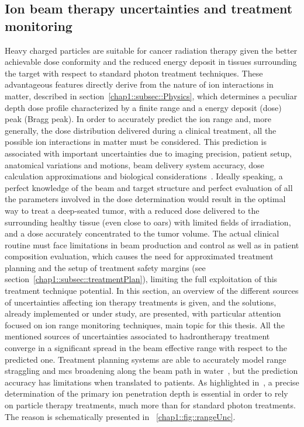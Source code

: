 \subsection{Ion beam therapy uncertainties and treatment monitoring}\label{chap1::subsec::uncertainty}
Heavy charged particles are suitable for cancer radiation therapy given the better achievable dose conformity and the reduced energy deposit in tissues surrounding the target with respect to standard photon treatment techniques. These advantageous features directly derive from the nature of ion interactions in matter, described in section~\ref{chap1::subsec::Physics}, which determines a peculiar depth dose profile characterized by a finite range and a energy deposit (dose) peak (Bragg peak). In order to accurately predict the ion range and, more generally, the dose distribution delivered during a clinical treatment, all the possible ion interactions in matter must be considered. This prediction is associated with important uncertainties due to imaging precision, patient setup, anatomical variations and motions, beam delivery system accuracy, dose calculation approximations and biological considerations~\parencite{Paganetti2012}. Ideally speaking, a perfect knowledge of the beam and target structure and perfect evaluation of all the parameters involved in the dose determination would result in the optimal way to treat a deep-seated tumor, with a reduced dose delivered to the surrounding healthy tissue (even close to \glspl{oar}) with limited fields of irradiation, and a dose accurately concentrated to the tumor volume. The actual clinical routine must face limitations in beam production and control as well as in patient composition evaluation, which causes the need for approximated treatment planning and the setup of treatment safety margins (see section~\ref{chap1::subsec::treatmentPlan}), limiting the full exploitation of this treatment technique potential. In this section, an overview of the different sources of uncertainties affecting ion therapy treatments is given, and the solutions, already implemented or under study, are presented, with particular attention focused on ion range monitoring techniques, main topic for this thesis.
All the mentioned sources of uncertainties associated to hadrontherapy treatment converge in a significant spread in the beam effective range with respect to the predicted one. Treatment planning systems are able to accurately model range straggling and \gls{mcs} broadening along the beam path in water~\parencite{Hong1996}, but the prediction accuracy has limitations when translated to patients. As highlighted in~\cite{Schlegel2008}, a precise determination of the primary ion penetration depth is essential in order to rely on particle therapy treatments, much more than for standard photon treatments. The reason is schematically presented in \figurename~\ref{chap1::fig::rangeUnc}.

